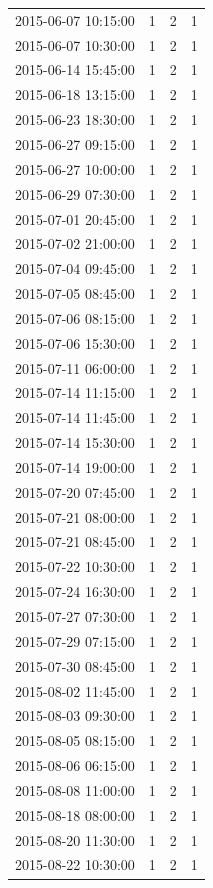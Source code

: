 \begin{tabular}{lrrr}
2015-06-07 10:15:00 & 1 & 2 & 1 \\
2015-06-07 10:30:00 & 1 & 2 & 1 \\
2015-06-14 15:45:00 & 1 & 2 & 1 \\
2015-06-18 13:15:00 & 1 & 2 & 1 \\
2015-06-23 18:30:00 & 1 & 2 & 1 \\
2015-06-27 09:15:00 & 1 & 2 & 1 \\
2015-06-27 10:00:00 & 1 & 2 & 1 \\
2015-06-29 07:30:00 & 1 & 2 & 1 \\
2015-07-01 20:45:00 & 1 & 2 & 1 \\
2015-07-02 21:00:00 & 1 & 2 & 1 \\
2015-07-04 09:45:00 & 1 & 2 & 1 \\
2015-07-05 08:45:00 & 1 & 2 & 1 \\
2015-07-06 08:15:00 & 1 & 2 & 1 \\
2015-07-06 15:30:00 & 1 & 2 & 1 \\
2015-07-11 06:00:00 & 1 & 2 & 1 \\
2015-07-14 11:15:00 & 1 & 2 & 1 \\
2015-07-14 11:45:00 & 1 & 2 & 1 \\
2015-07-14 15:30:00 & 1 & 2 & 1 \\
2015-07-14 19:00:00 & 1 & 2 & 1 \\
2015-07-20 07:45:00 & 1 & 2 & 1 \\
2015-07-21 08:00:00 & 1 & 2 & 1 \\
2015-07-21 08:45:00 & 1 & 2 & 1 \\
2015-07-22 10:30:00 & 1 & 2 & 1 \\
2015-07-24 16:30:00 & 1 & 2 & 1 \\
2015-07-27 07:30:00 & 1 & 2 & 1 \\
2015-07-29 07:15:00 & 1 & 2 & 1 \\
2015-07-30 08:45:00 & 1 & 2 & 1 \\
2015-08-02 11:45:00 & 1 & 2 & 1 \\
2015-08-03 09:30:00 & 1 & 2 & 1 \\
2015-08-05 08:15:00 & 1 & 2 & 1 \\
2015-08-06 06:15:00 & 1 & 2 & 1 \\
2015-08-08 11:00:00 & 1 & 2 & 1 \\
2015-08-18 08:00:00 & 1 & 2 & 1 \\
2015-08-20 11:30:00 & 1 & 2 & 1 \\
2015-08-22 10:30:00 & 1 & 2 & 1 \\

\end{tabular}
